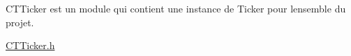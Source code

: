 CTTicker est un module qui contient une instance de Ticker pour l\textquotesingle{}ensemble du projet.

\mbox{\hyperlink{_c_t_ticker_8h}{CTTicker.\+h}} 